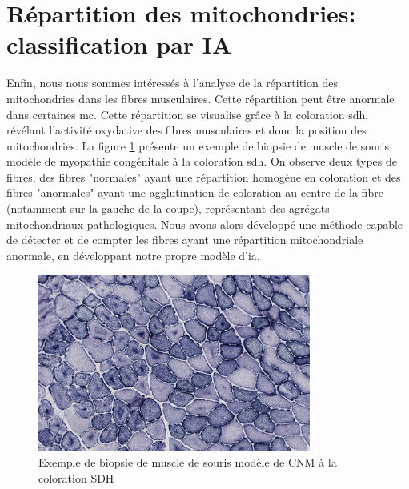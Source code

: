 \section{Répartition des mitochondries: classification par IA}
Enfin, nous nous sommes intéressés à l'analyse de la répartition des mitochondries dans les fibres musculaires. Cette répartition peut être anormale dans certaines \gls{mc}. Cette répartition se visualise grâce à la coloration \gls{sdh}, révélant l'activité oxydative des fibres musculaires et donc la position des mitochondries. La figure \ref{fig:sdh_example} présente un exemple de biopsie de muscle de souris modèle de myopathie congénitale à la coloration \gls{sdh}. On observe deux types de fibres, des fibres "normales" ayant une répartition homogène en coloration et des fibres "anormales" ayant une agglutination de coloration au centre de la fibre (notamment sur la gauche de la coupe), représentant des agrégats mitochondriaux pathologiques. Nous avons alors développé une méthode capable de détecter et de compter les fibres ayant une répartition mitochondriale anormale, en développant notre propre modèle d'\gls{ia}.

\begin{figure}[htbp]
 \centering
 \includegraphics[width=0.8\textwidth]{figures/sdh_example.jpg}
 \caption[Exemple de biopsie musculaire à la coloration SDH]{Exemple de biopsie de muscle de souris modèle de CNM à la coloration SDH}
 \label{fig:sdh_example}
\end{figure}
